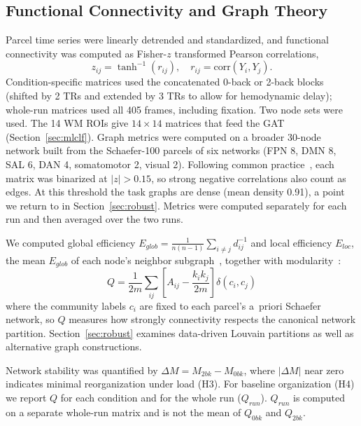 \documentclass[conference]{IEEEtran}
\begin{document}
\subsection{Functional Connectivity and Graph Theory}
\label{sec:fc}
Parcel time series were linearly detrended and standardized, and functional connectivity was computed as Fisher-$z$ transformed Pearson correlations,
\begin{equation}
z_{ij} = \tanh^{-1}(r_{ij}), \quad r_{ij} = \mathrm{corr}(Y_i, Y_j).
\end{equation}
Condition-specific matrices used the concatenated 0-back or 2-back blocks (shifted by 2 TRs and extended by 3 TRs to allow for hemodynamic delay); whole-run matrices used all 405 frames, including fixation. Two node sets were used. The 14 WM ROIs give $14\times14$ matrices that feed the GAT (Section~\ref{sec:mlclf}). Graph metrics were computed on a broader 30-node network built from the Schaefer-100 parcels of six networks (FPN 8, DMN 8, SAL 6, DAN 4, somatomotor 2, visual 2). Following common practice~\cite{rubinov2010complex}, each matrix was binarized at $|z|>0.15$, so strong negative correlations also count as edges. At this threshold the task graphs are dense (mean density 0.91), a point we return to in Section~\ref{sec:robust}. Metrics were computed separately for each run and then averaged over the two runs. 

We computed global efficiency $E_{glob}=\frac{1}{n(n-1)}\sum_{i\neq j}d_{ij}^{-1}$ and local efficiency $E_{loc}$, the mean $E_{glob}$ of each node's neighbor subgraph~\cite{latora2001efficient}, together with modularity~\cite{newman2006modularity}:
\begin{equation}
Q = \frac{1}{2m} \sum_{ij} \left[A_{ij} - \frac{k_i k_j}{2m}\right] \delta(c_i, c_j)
\end{equation}
where the community labels $c_i$ are fixed to each parcel's a~priori Schaefer network, so $Q$ measures how strongly connectivity respects the canonical network partition. Section~\ref{sec:robust} examines data-driven Louvain partitions as well as alternative graph constructions.

Network stability was quantified by $\Delta M = M_{2bk} - M_{0bk}$, where $|\Delta M|$ near zero indicates minimal reorganization under load (H3). For baseline organization (H4) we report $Q$ for each condition and for the whole run ($Q_{run}$). $Q_{run}$ is computed on a separate whole-run matrix and is not the mean of $Q_{0bk}$ and $Q_{2bk}$.
\end{document}
